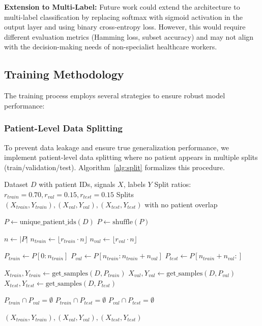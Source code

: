 \documentclass[conference]{IEEEtran}
\begin{document}
\textbf{Extension to Multi-Label:} Future work could extend the architecture to multi-label classification by replacing softmax with sigmoid activation in the output layer and using binary cross-entropy loss. However, this would require different evaluation metrics (Hamming loss, subset accuracy) and may not align with the decision-making needs of non-specialist healthcare workers.

\subsection{Training Methodology}

The training process employs several strategies to ensure robust model performance:

\subsubsection{Patient-Level Data Splitting}

To prevent data leakage and ensure true generalization performance, we implement patient-level data splitting where no patient appears in multiple splits (train/validation/test). Algorithm~\ref{alg:split} formalizes this procedure.

\begin{algorithm}[htbp]
\caption{Patient-Level Data Splitting (No Leakage)}
\label{alg:split}
\begin{algorithmic}[1]
\REQUIRE Dataset $D$ with patient IDs, signals $X$, labels $Y$
\REQUIRE Split ratios: $r_{train} = 0.70, r_{val} = 0.15, r_{test} = 0.15$
\ENSURE Splits $(X_{train}, Y_{train}), (X_{val}, Y_{val}), (X_{test}, Y_{test})$ with no patient overlap

\STATE $P \gets \text{unique\_patient\_ids}(D)$ 
\STATE $P \gets \text{shuffle}(P)$ 

\STATE $n \gets |P|$
\STATE $n_{train} \gets \lfloor r_{train} \cdot n \rfloor$
\STATE $n_{val} \gets \lfloor r_{val} \cdot n \rfloor$

\STATE $P_{train} \gets P[0:n_{train}]$
\STATE $P_{val} \gets P[n_{train}:n_{train}+n_{val}]$
\STATE $P_{test} \gets P[n_{train}+n_{val}:]$

\STATE $X_{train}, Y_{train} \gets \text{get\_samples}(D, P_{train})$
\STATE $X_{val}, Y_{val} \gets \text{get\_samples}(D, P_{val})$
\STATE $X_{test}, Y_{test} \gets \text{get\_samples}(D, P_{test})$

\STATE {}
\REQUIRE $P_{train} \cap P_{val} = \emptyset$
\REQUIRE $P_{train} \cap P_{test} = \emptyset$
\REQUIRE $P_{val} \cap P_{test} = \emptyset$

\RETURN $(X_{train}, Y_{train}), (X_{val}, Y_{val}), (X_{test}, Y_{test})$
\end{algorithmic}
\end{algorithm}
\end{document}
